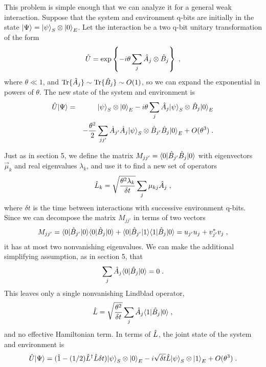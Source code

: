 This problem is simple enough that we can analyze it for a general
weak interaction.  Suppose that the system and environment q-bits are
initially in the state ${| \Psi \rangle} = {| \psi \rangle}_S\otimes{| 0 \rangle}_E$.
Let the interaction be a two q-bit unitary transformation of the form
\begin{equation}
{\hat U} = \exp\left\{ - i \theta \sum_j {\hat A}_j\otimes{\hat B}_j \right\} \;,
\end{equation}
where $\theta\ll1$,
and ${\rm Tr}\{{\hat A}_j\} \sim {\rm Tr}\{{\hat B}_j\} \sim O(1)$, so we
can expand the exponential in powers of $\theta$.  The new state of
the system and environment is
\begin{eqnarray}
{\hat U}{| \Psi \rangle} &=& {| \psi \rangle}_S\otimes{| 0 \rangle}_E
  - i \theta \sum_j {\hat A}_j{| \psi \rangle}_S\otimes{\hat B}_j{| 0 \rangle}_E
  \nonumber\\
&& - {\theta^2\over2}\sum_{jj'} {\hat A}_{j'}{\hat A}_j{| \psi \rangle}_S \otimes
  {\hat B}_{j'}{\hat B}_j{| 0 \rangle}_E + O(\theta^3) \;.
\end{eqnarray}

Just as in section 5, we define the matrix
$M_{jj'} = {\langle 0 |}{\hat B}_{j'}{\hat B}_j{| 0 \rangle}$ with eigenvectors ${\vec\mu}_k$ and
real eigenvalues $\lambda_k$, and use it to find a new set of operators
\begin{equation}
{\hat L}_k = \sqrt{\theta^2\lambda_k\over\delta t} \sum_j \mu_{kj} {\hat A}_j \;,
\end{equation}
where $\delta t$ is the time between interactions with successive
environment q-bits.
Since we can decompose the matrix $M_{jj'}$ in terms of two vectors
\begin{equation}
M_{jj'} = {\langle 0 |}{\hat B}_{j'}{| 0 \rangle}{\langle 0 |}{\hat B}_j{| 0 \rangle}
  + {\langle 0 |}{\hat B}_{j'}{| 1 \rangle}{\langle 1 |}{\hat B}_j{| 0 \rangle} = u_{j'}u_{j} + v_{j'}^*v_j \;,
\end{equation}
it has at most two nonvanishing eigenvalues.
We can make the additional simplifying assumption, as in section 5, that
\begin{equation}
\sum_j {\hat A}_j {\langle 0 |}{\hat B}_j{| 0 \rangle} = 0 \;.
\label{first_order}
\end{equation}
This leaves only a single nonvanishing Lindblad operator,
\begin{equation}
{\hat L} = \sqrt{\theta^2\over\delta t} \sum_j {\hat A}_j {\langle 1 |}{\hat B}_j{| 0 \rangle} \;,
\end{equation}
and no effective Hamiltonian term.
In terms of ${\hat L}$, the joint state of the system and environment is
\begin{equation}
{\hat U}{| \Psi \rangle} = ({\hat 1} - (1/2){\hat L^\dagger}{\hat L} \delta t) {| \psi \rangle}_S\otimes{| 0 \rangle}_E
  - i \sqrt{\delta t} {\hat L}{| \psi \rangle}_S\otimes{| 1 \rangle}_E
  + O(\theta^3) \;.
\end{equation}

